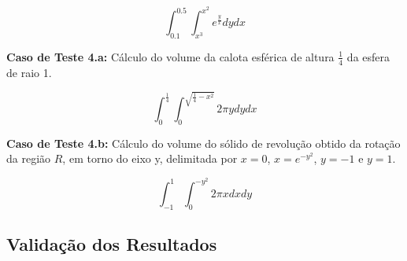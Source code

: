 \documentclass[a4,12pt]{horizon-theme}
\begin{document}
\begin{equation}
  \int_{0.1}^{0.5} \int_{x^3}^{x^2} e^{\frac{y}{x}}dydx
\end{equation}


{\bf Caso de Teste 4.a:} Cálculo do volume da calota esférica de altura $\frac{1}{4}$ da esfera de raio 1.



\begin{equation}
  \int_0^{\frac{1}{4}}\int_0^{\sqrt{\frac{1}{4} - x^2}} 2\pi y dydx
\end{equation}


{\bf Caso de Teste 4.b:} Cálculo do volume do sólido de revolução obtido da rotação da região $R$, em torno do eixo y, delimitada por $x = 0$, $x = e^{-y^2}$, $y = -1$ e $y = 1$.



\begin{equation}
  \int_{-1}^1 \int_0^{-y^2} 2\pi x dxdy
\end{equation}

\newpage
\subsection{Validação dos Resultados}
\end{document}
